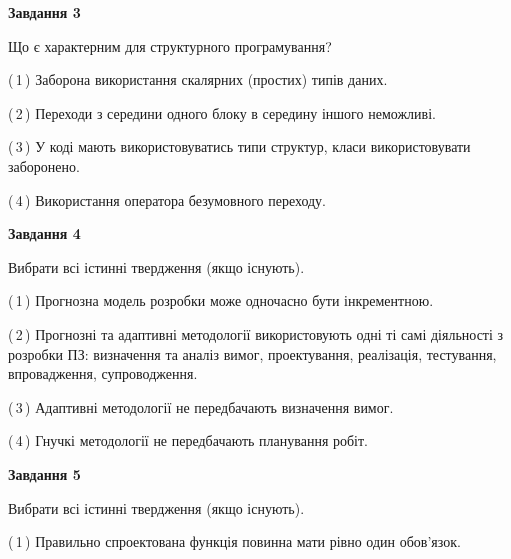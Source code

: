 \documentclass[10pt, ukrainian]{article}
\begin{document}
{\begin {large}
{\begin {center}\textbf{Завдання 3}\end {center}}\par
Що є характерним для структурного програмування?\par
\vspace{2mm}



(\,1\,) Заборона використання скалярних (простих) типів даних. %



(\,2\,) Переходи з середини одного блоку в середину іншого неможливі. %



(\,3\,) У коді мають використовуватись типи структур, класи використовувати заборонено. %



(\,4\,) Використання оператора безумовного переходу. %


{\begin {center}\textbf{Завдання 4}\end {center}}\par
Вибрати всі істинні твердження (якщо існують).\par
\vspace{2mm}



(\,1\,) Прогнозна модель розробки може одночасно бути інкрементною. %



(\,2\,) Прогнозні та адаптивні методології використовують одні ті самі діяльності з розробки ПЗ: визначення та аналіз вимог, проектування, реалізація, тестування, впровадження, супроводження. %



(\,3\,) Адаптивні методології не передбачають визначення вимог. %



(\,4\,) Гнучкі методології не передбачають планування робіт. %


{\begin {center}\textbf{Завдання 5}\end {center}}\par
Вибрати всі істинні твердження (якщо існують).\par
\vspace{2mm}



(\,1\,) Правильно спроектована функція повинна мати рівно один обов'язок. %




\end{large}}
\end{document}
